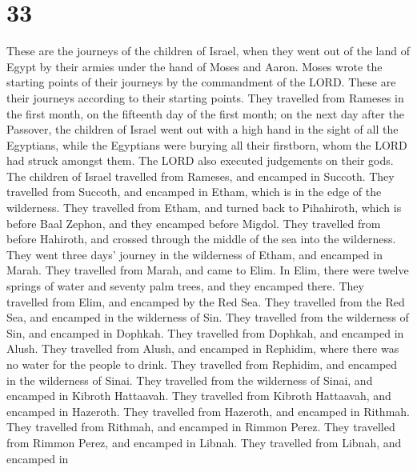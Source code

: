 \hypertarget{section-32}{%
\section{33}\label{section-32}}

 These are the journeys of the children of Israel, when
they went out of the land of Egypt by their armies under the hand of
Moses and Aaron.  Moses wrote the starting points of their
journeys by the commandment of the LORD. These are their journeys
according to their starting points.  They travelled from
Rameses in the first month, on the fifteenth day of the first month; on
the next day after the Passover, the children of Israel went out with a
high hand in the sight of all the Egyptians,  while the
Egyptians were burying all their firstborn, whom the LORD had struck
amongst them. The LORD also executed judgements on their gods.
 The children of Israel travelled from Rameses, and
encamped in Succoth.  They travelled from Succoth, and
encamped in Etham, which is in the edge of the wilderness.
 They travelled from Etham, and turned back to Pihahiroth,
which is before Baal Zephon, and they encamped before Migdol.
 They travelled from before Hahiroth, and crossed through
the middle of the sea into the wilderness. They went three days' journey
in the wilderness of Etham, and encamped in Marah.  They
travelled from Marah, and came to Elim. In Elim, there were twelve
springs of water and seventy palm trees, and they encamped there.
 They travelled from Elim, and encamped by the Red Sea.
 They travelled from the Red Sea, and encamped in the
wilderness of Sin.  They travelled from the wilderness of
Sin, and encamped in Dophkah.  They travelled from
Dophkah, and encamped in Alush.  They travelled from
Alush, and encamped in Rephidim, where there was no water for the people
to drink.  They travelled from Rephidim, and encamped in
the wilderness of Sinai.  They travelled from the
wilderness of Sinai, and encamped in Kibroth Hattaavah. 
They travelled from Kibroth Hattaavah, and encamped in Hazeroth.
 They travelled from Hazeroth, and encamped in Rithmah.
 They travelled from Rithmah, and encamped in Rimmon
Perez.  They travelled from Rimmon Perez, and encamped in
Libnah.  They travelled from Libnah, and encamped in
